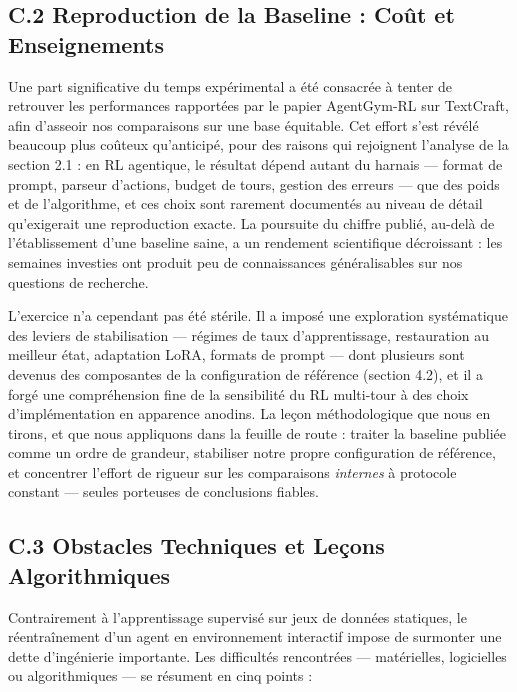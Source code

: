 \documentclass[11pt,a4paper]{article}
\begin{document}
\subsection*{C.2 Reproduction de la Baseline : Coût et Enseignements}
Une part significative du temps expérimental a été consacrée à tenter de retrouver les performances rapportées par le papier AgentGym-RL sur TextCraft, afin d'asseoir nos comparaisons sur une base équitable. Cet effort s'est révélé beaucoup plus coûteux qu'anticipé, pour des raisons qui rejoignent l'analyse de la section 2.1 : en RL agentique, le résultat dépend autant du harnais — format de prompt, parseur d'actions, budget de tours, gestion des erreurs — que des poids et de l'algorithme, et ces choix sont rarement documentés au niveau de détail qu'exigerait une reproduction exacte. La poursuite du chiffre publié, au-delà de l'établissement d'une baseline saine, a un rendement scientifique décroissant : les semaines investies ont produit peu de connaissances généralisables sur nos questions de recherche.

L'exercice n'a cependant pas été stérile. Il a imposé une exploration systématique des leviers de stabilisation — régimes de taux d'apprentissage, restauration au meilleur état, adaptation LoRA, formats de prompt — dont plusieurs sont devenus des composantes de la configuration de référence (section 4.2), et il a forgé une compréhension fine de la sensibilité du RL multi-tour à des choix d'implémentation en apparence anodins. La leçon méthodologique que nous en tirons, et que nous appliquons dans la feuille de route : traiter la baseline publiée comme un ordre de grandeur, stabiliser notre propre configuration de référence, et concentrer l'effort de rigueur sur les comparaisons \emph{internes} à protocole constant — seules porteuses de conclusions fiables.

\subsection*{C.3 Obstacles Techniques et Leçons Algorithmiques}
Contrairement à l'apprentissage supervisé sur jeux de données statiques, le réentraînement d'un agent en environnement interactif impose de surmonter une dette d'ingénierie importante. Les difficultés rencontrées — matérielles, logicielles ou algorithmiques — se résument en cinq points :
\end{document}
